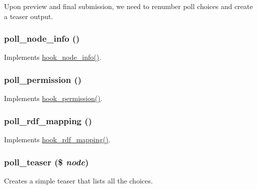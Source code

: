 Upon preview and final submission, we need to renumber poll choices and create a teaser output. \hypertarget{poll_8module_a24046bf2bb6bbc96b205eff7c093a5a8}{
\subsubsection[{poll\_\-node\_\-info}]{\setlength{\rightskip}{0pt plus 5cm}poll\_\-node\_\-info ()}}
\label{poll_8module_a24046bf2bb6bbc96b205eff7c093a5a8}
Implements \hyperlink{group__node__api__hooks_ga3b6ad51d7815d1cdd093b0e0f350cbd0}{hook\_\-node\_\-info()}. \hypertarget{poll_8module_a848a374097349473b6bfe2456bdad331}{
\subsubsection[{poll\_\-permission}]{\setlength{\rightskip}{0pt plus 5cm}poll\_\-permission ()}}
\label{poll_8module_a848a374097349473b6bfe2456bdad331}
Implements \hyperlink{group__hooks_ga2b22b45f4925f2478412477bae329713}{hook\_\-permission()}. \hypertarget{poll_8module_a06fc139d4b3f04776fc8200ce19b8701}{
\subsubsection[{poll\_\-rdf\_\-mapping}]{\setlength{\rightskip}{0pt plus 5cm}poll\_\-rdf\_\-mapping ()}}
\label{poll_8module_a06fc139d4b3f04776fc8200ce19b8701}
Implements \hyperlink{group__rdf_gae3e7f047bdcb9309b323e2af09966765}{hook\_\-rdf\_\-mapping()}. \hypertarget{poll_8module_a429acb5ea44409fe3c93d8765172c9bd}{
\subsubsection[{poll\_\-teaser}]{\setlength{\rightskip}{0pt plus 5cm}poll\_\-teaser (\$ {\em node})}}
\label{poll_8module_a429acb5ea44409fe3c93d8765172c9bd}
Creates a simple teaser that lists all the choices.

